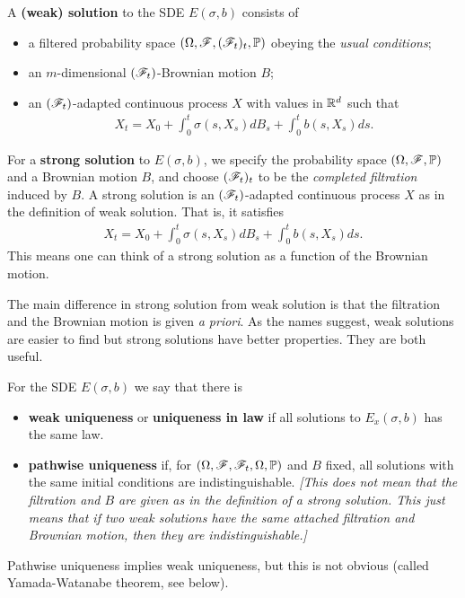 \documentclass[12pt,a4paper]{article}
\renewenvironment{i}
{\begin{itemize} 
	}%
	{\end{itemize}
}
\begin{document}
 A \textbf{(weak) solution} to the SDE $E(\sigma, b)$ consists of
\begin{i}
\item a filtered probability space $(\Omega, \mathscr{F}, (\mathscr{F}_t)_{t}, \mathbb{P})$ obeying the \emph{usual conditions};
\item an $m$-dimensional $(\mathscr{F}_t)$-Brownian motion $B$;
\item an $(\mathscr{F}_t)$-adapted continuous process $X$ with values in $\mathbb{R}^d$ such that
\begin{align*}
X_t = X_0 + \int_0^t \sigma(s, X_s) dB_s + \int_0^t b(s, X_s) ds.
\end{align*} 
\end{i}
\s

 For a \textbf{strong solution} to $E(\sigma, b)$, we specify the probability space $(\Omega, \mathscr{F}, \mathbb{P})$ and a Brownian motion $B$, and choose $(\mathscr{F}_t)_t$ to be the \emph{completed filtration} induced by $B$. A strong solution is an $(\mathscr{F}_t)$-adapted continuous process $X$ as in the definition of weak solution. That is, it satisfies
\begin{align*}
X_t = X_0 + \int_0^t \sigma(s, X_s) dB_s + \int_0^t b(s, X_s) ds.
\end{align*} 
This means one can think of a strong solution as a function of the Brownian motion.
\s

The main difference in strong solution from weak solution is that the filtration and the Brownian motion is given \textit{a priori}. As the names suggest, weak solutions are easier to find but strong solutions have better properties. They are both useful.
\s

 For the SDE $E(\sigma, b)$ we say that there is
\begin{i}
\item \textbf{weak uniqueness} or \textbf{uniqueness in law} if all solutions to $E_x(\sigma, b)$ has the same law.
\item \textbf{pathwise uniqueness} if, for $(\Omega, \mathscr{F}, \mathscr{F}_t, \Omega, \mathbb{P})$ and $B$ fixed, all solutions with the same initial conditions are indistinguishable. \emph{[This does not mean that the filtration and $B$ are given as in the definition of a strong solution. This just means that if two weak solutions have the same attached filtration and Brownian motion, then they are indistinguishable.]}
\end{i}
Pathwise uniqueness implies weak uniqueness, but this is not obvious (called Yamada-Watanabe theorem, see below).
\s
\end{document}
